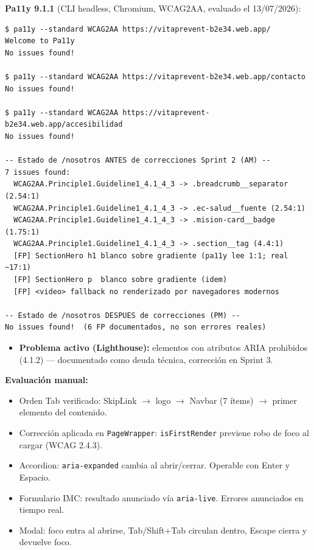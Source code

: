 \documentclass[12pt, a4paper]{article}
\begin{document}
\textbf{Pa11y 9.1.1} (CLI headless, Chromium, WCAG2AA, evaluado el 13/07/2026):
\begin{lstlisting}[language={}, caption={Salida Pa11y -- estado final tras correcciones}]
$ pa11y --standard WCAG2AA https://vitaprevent-b2e34.web.app/
Welcome to Pa11y
No issues found!

$ pa11y --standard WCAG2AA https://vitaprevent-b2e34.web.app/contacto
No issues found!

$ pa11y --standard WCAG2AA https://vitaprevent-b2e34.web.app/accesibilidad
No issues found!

-- Estado de /nosotros ANTES de correcciones Sprint 2 (AM) --
7 issues found:
  WCAG2AA.Principle1.Guideline1_4.1_4_3 -> .breadcrumb__separator (2.54:1)
  WCAG2AA.Principle1.Guideline1_4.1_4_3 -> .ec-salud__fuente (2.54:1)
  WCAG2AA.Principle1.Guideline1_4.1_4_3 -> .mision-card__badge (1.75:1)
  WCAG2AA.Principle1.Guideline1_4.1_4_3 -> .section__tag (4.4:1)
  [FP] SectionHero h1 blanco sobre gradiente (pa11y lee 1:1; real ~17:1)
  [FP] SectionHero p  blanco sobre gradiente (idem)
  [FP] <video> fallback no renderizado por navegadores modernos

-- Estado de /nosotros DESPUES de correcciones (PM) --
No issues found!  (6 FP documentados, no son errores reales)
\end{lstlisting}

\begin{itemize}
  \item \textbf{Problema activo (Lighthouse):} elementos con atributos ARIA prohibidos (4.1.2) --- documentado como deuda técnica, corrección en Sprint 3.
\end{itemize}

\textbf{Evaluación manual:}
\begin{itemize}
  \item Orden Tab verificado: SkipLink $\to$ logo $\to$ Navbar (7 ítems) $\to$ primer elemento del contenido.
  \item Corrección aplicada en \texttt{PageWrapper}: \texttt{isFirstRender} previene robo de foco al cargar (WCAG 2.4.3).
  \item Accordion: \texttt{aria-expanded} cambia al abrir/cerrar. Operable con Enter y Espacio.
  \item Formulario IMC: resultado anunciado vía \texttt{aria-live}. Errores anunciados en tiempo real.
  \item Modal: foco entra al abrirse, Tab/Shift+Tab circulan dentro, Escape cierra y devuelve foco.
\end{itemize}
\end{document}
